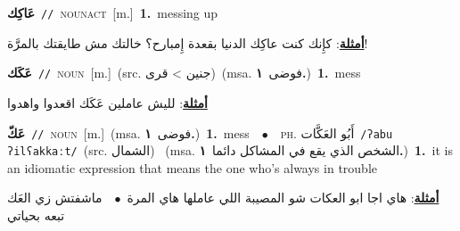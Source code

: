 \documentclass[10pt,a4paper,twoside]{article} %
\begin{document}
\begin{multicols}{2}
{\setlength\topsep{0pt}\textbf{\foreignlanguage{arabic}{عَاكِك}}\ {\color{gray}\texttt{//}\color{black}}\ \textsc{noun\textunderscore act}\ [m.]\ \textbf{1.}~messing up\  \begin{flushright}\color{gray}\foreignlanguage{arabic}{\textbf{\underline{\foreignlanguage{arabic}{أمثلة}}}: كإِنك كنت عاكِك الدنيا بقعدة إِمبارح؟ خالتك مش طايقتك بالمرَّة!}\end{flushright}\color{black}} \vspace{2mm}

{\setlength\topsep{0pt}\textbf{\foreignlanguage{arabic}{عَكَك}}\ {\color{gray}\texttt{//}\color{black}}\ \textsc{noun}\ [m.]\ (src. \color{gray}\foreignlanguage{arabic}{جنين > قرى}\color{black})\ \color{gray}(msa. \foreignlanguage{arabic}{فوضى}~\foreignlanguage{arabic}{\textbf{١.}})\color{black}\ \textbf{1.}~mess\  \begin{flushright}\color{gray}\foreignlanguage{arabic}{\textbf{\underline{\foreignlanguage{arabic}{أمثلة}}}: لليش عاملين عَكَك اقعدوا واهدوا}\end{flushright}\color{black}} \vspace{2mm}

{\setlength\topsep{0pt}\textbf{\foreignlanguage{arabic}{عَكّ}}\ {\color{gray}\texttt{//}\color{black}}\ \textsc{noun}\ [m.]\ \color{gray}(msa. \foreignlanguage{arabic}{فوضى}~\foreignlanguage{arabic}{\textbf{١.}})\color{black}\ \textbf{1.}~mess\ \ $\bullet$\ \ \textsc{ph.} \color{gray} \foreignlanguage{arabic}{أَبُو العَكَّات}\color{black}\ {\color{gray}\texttt{/{\sffamily ʔabu ʔilʕakkaːt}/}\color{black}}\ \color{gray}(src. \foreignlanguage{arabic}{الشمال})\color{black}\ \color{gray} (msa. \foreignlanguage{arabic}{الشخص الذي يقع في المشاكل دائما}~\foreignlanguage{arabic}{\textbf{١.}})\color{black}\ \textbf{1.}~it is an idiomatic expression that means the one who's always in trouble\  \begin{flushright}\color{gray}\foreignlanguage{arabic}{\textbf{\underline{\foreignlanguage{arabic}{أمثلة}}}: هاي اجا ابو العكات شو المصيبة اللي عاملها هاي المرة\ $\bullet$\ \  ماشفتش زي العَك تبعه بحياتي}\end{flushright}\color{black}} \vspace{2mm}


\end{multicols}
\end{document}
